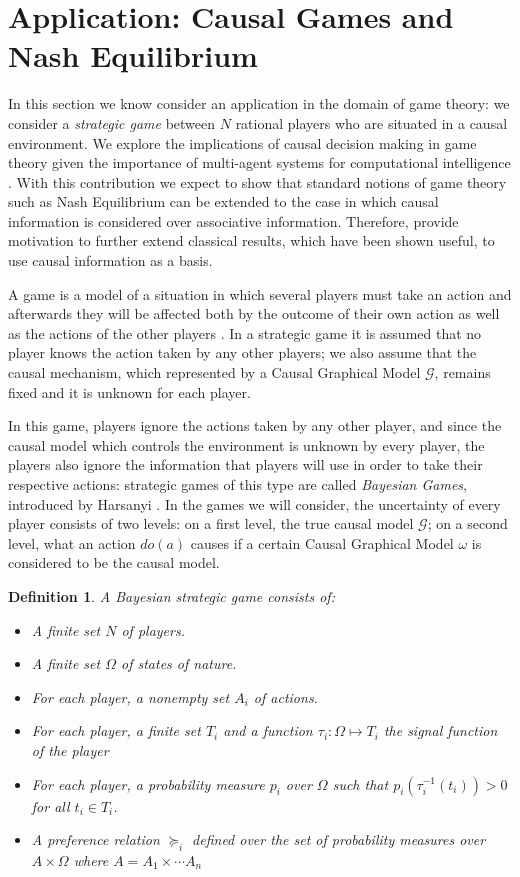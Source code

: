 \documentclass[review]{elsarticle}
\newtheorem{definition}[theorem]{Definition}
\begin{document}
\section{Application: Causal Games and Nash Equilibrium}
\label{causal_games}
In this section we know consider an application in the domain of game theory: we consider a \textit{strategic game} between $N$ rational players who are situated in a causal environment. We explore the implications of causal decision making in game theory given the importance of multi-agent systems for computational intelligence \cite{shoham2008multiagen,wooldridge2009introductiont}. With this contribution we expect to show that standard notions of game theory such as Nash Equilibrium can be extended to the case in which causal information is considered over associative information. Therefore, provide motivation to further extend classical results, which have been shown useful, to use causal information as a basis.

A game is a model of a situation in which several players must take an action and afterwards they will be affected both by the outcome of their own action as well as the actions of the other players \citep{osborne1994course}. In a strategic game it is assumed that no player knows the action taken by any other players; we also assume that the causal mechanism, which represented by a Causal Graphical Model $\mathcal{G}$, remains fixed and it is unknown for each player. 

In this game, players ignore the actions taken by any other player, and since the causal model which controls the environment is unknown by every player, the players also ignore the information that players will use in order to take their respective actions: strategic games of this type are called \textit{Bayesian Games}, introduced by Harsanyi \citep{harsanyi1967games1,harsanyi1968games2,harsanyi1968games3}. In the games we will consider, the uncertainty of every player consists of two levels: on a first level, the true causal model $\mathcal{G}$; on a second level, what an action $do(a)$ causes if a certain Causal Graphical Model $\omega$ is considered to be the causal model. 
\begin{definition}
A Bayesian strategic game \citep{osborne1994course} consists of:
\begin{itemize}
\item A finite set $N$ of players.
\item A finite set $\Omega$ of \textit{states of nature}.
\item For each player, a nonempty set $A_i$ of actions.
\item For each player, a finite set $T_i$ and a function $\tau_i : \Omega \mapsto T_i$ the signal function of the player
\item For each player, a probability measure $p_i$ over $\Omega$ such that $p_i (\tau^{-1}_i (t_i))>0$ for all $t_i \in T_i$.
\item A preference relation $\succeq_i$ defined over the set of probability measures over $A \times \Omega$ where $A= A_1 \times \cdots A_n$
\end{itemize}
\end{definition}
\end{document}
